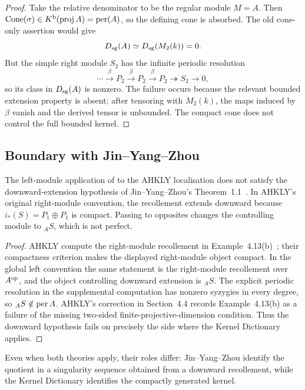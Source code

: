 \begin{proof}
Take the relative denominator to be the regular module \(M=A\).  Then
\(\operatorname{Cone}(\sigma)\in K^{\mathrm b}(\operatorname{proj}A)=\operatorname{per}(A)\), so the defining cone is absorbed.  The old cone-only assertion would give
\[
 D_{\mathrm{sg}}(A)\simeq D_{\mathrm{sg}}(M_2(k))=0.
\]
But the simple right module \(S_2\) has the infinite periodic resolution
\[
 \cdots\xrightarrow{\beta}P_2\xrightarrow{\beta}P_2
 \xrightarrow{\beta}P_2\twoheadrightarrow S_2\to0,
\]
so its class in \(D_{\mathrm{sg}}(A)\) is nonzero.  The failure occurs because the relevant bounded extension property is absent; after tensoring with \(M_2(k)\), the maps induced by \(\beta\) vanish and the derived tensor is unbounded.  The compact cone does not control the full bounded kernel.
\end{proof}


\subsection{Boundary with Jin--Yang--Zhou}\label{subsec:jyz-boundary}
\begin{lemma}\label{lem:jyz-boundary}
The left-module application of  to the AHKLY localisation does not satisfy the downward-extension hypothesis of Jin--Yang--Zhou's Theorem~1.1~\cite{JinYangZhou}.  In AHKLY's original right-module convention, the recollement extends downward because \(i_*(S)=P_1\oplus P_1\) is compact.  Passing to opposites changes the controlling module to \({}_AS\), which is not perfect.
\end{lemma}

\begin{proof}
AHKLY compute the right-module recollement in Example~4.13(b)~\cite{AHKLY17}; their compactness criterion makes the displayed right-module object compact.  In the global left convention the same statement is the right-module recollement over \(A^{\mathrm{op}}\), and the object controlling downward extension is \({}_AS\).  The explicit periodic resolution in the supplemental computation has nonzero syzygies in every degree, so \({}_AS\notin\operatorname{per} A\).  AHKLY's correction in Section~4.4 records Example~4.13(b) as a failure of the missing two-sided finite-projective-dimension condition.  Thus the downward hypothesis fails on precisely the side where the Kernel Dictionary applies.
\end{proof}

Even when both theories apply, their roles differ: Jin--Yang--Zhou identify the quotient in a singularity sequence obtained from a downward recollement, while the Kernel Dictionary identifies the compactly generated kernel.

